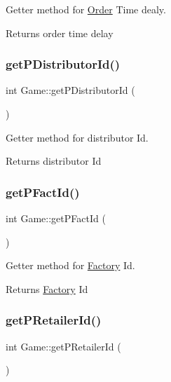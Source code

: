 Getter method for \hyperlink{class_order}{Order} Time dealy. 

\begin{DoxyReturn}{Returns}
order time delay 
\end{DoxyReturn}
\mbox{\label{class_game_ab59b422a861f1aa2d59c176b9b57ed80}} 
\subsubsection{\texorpdfstring{get\+P\+Distributor\+Id()}{getPDistributorId()}}
{\footnotesize\ttfamily int Game\+::get\+P\+Distributor\+Id (\begin{DoxyParamCaption}{ }\end{DoxyParamCaption})}



Getter method for distributor Id. 

\begin{DoxyReturn}{Returns}
distributor Id 
\end{DoxyReturn}
\mbox{\label{class_game_a9d4b2445fa34422a03d99edba54c0c28}} 
\subsubsection{\texorpdfstring{get\+P\+Fact\+Id()}{getPFactId()}}
{\footnotesize\ttfamily int Game\+::get\+P\+Fact\+Id (\begin{DoxyParamCaption}{ }\end{DoxyParamCaption})}



Getter method for \hyperlink{class_factory}{Factory} Id. 

\begin{DoxyReturn}{Returns}
\hyperlink{class_factory}{Factory} Id 
\end{DoxyReturn}
\mbox{\label{class_game_ac8cb0ad6c01ecddc3c76bb0bdbc9202b}} 
\subsubsection{\texorpdfstring{get\+P\+Retailer\+Id()}{getPRetailerId()}}
{\footnotesize\ttfamily int Game\+::get\+P\+Retailer\+Id (\begin{DoxyParamCaption}{ }\end{DoxyParamCaption})}



